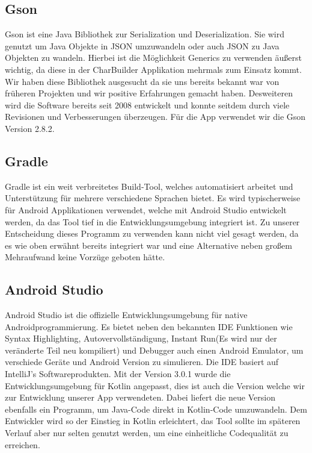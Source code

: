 \subsection{Gson}

Gson ist eine Java Bibliothek zur Serialization und Deserialization. Sie wird genutzt um Java Objekte in JSON umzuwandeln oder auch JSON zu Java Objekten zu wandeln. Hierbei ist die Möglichkeit Generics zu verwenden äußerst wichtig, da diese in der CharBuilder Applikation mehrmals zum Einsatz kommt. Wir haben diese Bibliothek ausgesucht da sie uns bereits bekannt war von früheren Projekten und wir positive Erfahrungen gemacht haben. Desweiteren wird die Software bereits seit 2008 entwickelt und konnte seitdem durch viele Revisionen und Verbesserungen überzeugen. Für die App verwendet wir die Gson Version 2.8.2.\cite{gson}

\subsection{Gradle}

Gradle ist ein weit verbreitetes Build-Tool, welches automatisiert arbeitet und Unterstützung für mehrere verschiedene Sprachen bietet. Es wird typischerweise für Android Applikationen verwendet, welche mit Android Studio entwickelt werden, da das Tool tief in die Entwicklungsumgebung integriert ist. Zu unserer Entscheidung dieses Programm zu verwenden kann nicht viel gesagt werden, da es wie oben erwähnt bereits integriert war und eine Alternative neben großem Mehraufwand keine Vorzüge geboten hätte.

\subsection{Android Studio}

Android Studio ist die offizielle Entwicklungsumgebung für native Androidprogrammierung. Es bietet neben den bekannten IDE Funktionen wie Syntax Highlighting, Autovervollständigung, Instant Run(Es wird nur der veränderte Teil neu kompiliert) und Debugger auch einen Android Emulator, um verschiede Geräte und Android Version zu simulieren. Die IDE basiert auf IntelliJ's Softwareprodukten. Mit der Version 3.0.1 wurde die Entwicklungsumgebung für Kotlin angepasst, dies ist auch die Version welche wir zur Entwicklung unserer App verwendeten. Dabei liefert die neue Version ebenfalls ein Programm, um Java-Code direkt in Kotlin-Code umzuwandeln.  Dem Entwickler wird so der Einstieg in Kotlin erleichtert, das Tool sollte im späteren Verlauf aber nur selten genutzt werden, um eine einheitliche Codequalität zu erreichen.


